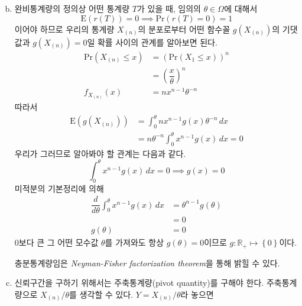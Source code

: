 \documentclass[answers]{exam}
\begin{document}
\begin{questions}
\begin{solution}
\begin{enumerate}[(a)]
\begin{equation}
        \end{equation}
        \item 완비통계량의 정의상 어떤 통계량 $T$가 있을 때, 임의의 $\theta\in \Omega$에 대해서
        \begin{equation}
          \mathrm{E}\left(r\left(T\right)\right)=0 \implies \mathrm{Pr}\left(r\left(T\right)=0\right)=1
        \end{equation}
        이어야 하므로 우리의 통계량 $X_{\left(n\right)}$의 분포로부터 어떤 함수꼴 $g\left(X_{\left(n\right)}\right)$의 기댓값과 $g\left(X_{\left(n\right)}\right)=0$일 확률 사이의 관계를 알아보면 된다.
        \begin{align}
          \mathrm{Pr}\left(X_{\left(n\right)}\leq x\right) &= \left(\mathrm{Pr}\left(X_{1}\leq x\right)\right)^{n}\\
          &=\left(\dfrac{x}{\theta}\right)^{n}\\
          f_{X_{\left(n\right)}}\left(x\right) &= nx^{n-1}\theta^{-n}
        \end{align}
        따라서
        \begin{align}
          \mathrm{E}\left(g\left(X_{\left(n\right)}\right)\right) &= \int_{0}^{\theta}nx^{n-1}g\left(x\right)\theta^{-n}\,dx\\
          &=n\theta^{-n}\int_{0}^{\theta}x^{n-1}g\left(x\right)\,dx=0
        \end{align}
        우리가 그러므로 알아봐야 할 관계는 다음과 같다.
        \begin{equation}
          \int_{0}^{\theta}x^{n-1}g\left(x\right)\,dx=0 \implies g\left(x\right)=0
        \end{equation}
        미적분의 기본정리에 의해
        \begin{align}
          \dfrac{d}{d\theta}\int_{0}^{\theta}x^{n-1}g\left(x\right)\,dx &= \theta^{n-1}g\left(\theta\right)\\
          &=0\\
          g\left(\theta\right) &= 0
        \end{align}
        0보다 큰 그 어떤 모수값 $\theta$를 가져와도 항상 $g\left(\theta\right)=0$이므로 $g:\mathbb{R}_{+}\mapsto \left\{0\right\}$이다.\par
        충분통계량임은 \emph{Neyman-Fisher factorization theorem}을 통해 밝힐 수 있다.
        \item 신뢰구간을 구하기 위해서는 주축통계량(pivot quantity)를 구해야 한다. 주축통계량으로 $X_{\left(n\right)}/\theta$를 생각할 수 있다. $Y=X_{\left(n\right)}/\theta$라 놓으면
        \begin{equation}

\end{equation}
\end{enumerate}
\end{solution}
\end{questions}
\end{document}
